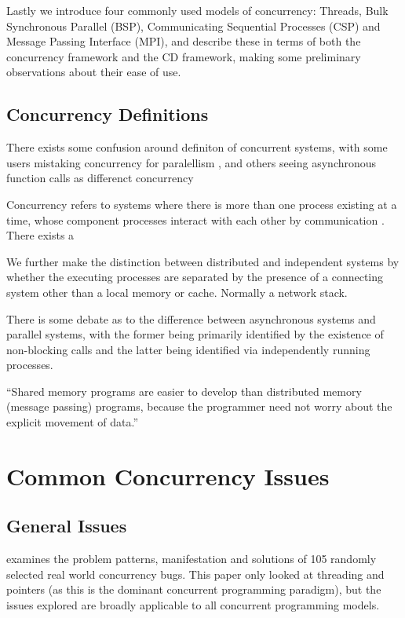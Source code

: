 \documentclass{sig-alternate}
\begin{document}
Lastly we introduce four commonly used models of concurrency: Threads, Bulk Synchronous Parallel (BSP), Communicating Sequential Processes (CSP) and Message Passing Interface (MPI), and describe these in terms of both the concurrency framework and the CD framework, making some preliminary observations about their ease of use.

\subsection{Concurrency Definitions}
There exists some confusion around definiton of concurrent systems, with some users mistaking concurrency for paralellism \cite{pike13:_concur_paral}, and others seeing asynchronous function calls as differenct concurrency

Concurrency refers to systems where there is more than one process existing at a time, whose component processes interact with each other by communication \cite{tpc}.
There exists a 

We further make the distinction between distributed and independent systems by whether the executing processes are separated by the presence of a connecting system other than a local memory or cache. Normally a network stack.

There is some debate as to the difference between asynchronous systems and parallel systems, with the former being primarily identified by the existence of non-blocking calls and the latter being identified via independently running processes.

\cite{john90:_munin} ``Shared memory programs are easier to develop than distributed memory (message passing) programs, because the programmer need not worry about the explicit movement of data.''


\section{Common Concurrency Issues}
\subsection{General Issues}
\cite{shanlu08:_learn_mistak_compr_study_real} examines the problem patterns, manifestation and solutions of 105 randomly selected real world concurrency bugs. This paper only looked at threading and pointers (as this is the dominant concurrent programming paradigm), but the issues explored are broadly applicable to all concurrent programming models.
\end{document}
